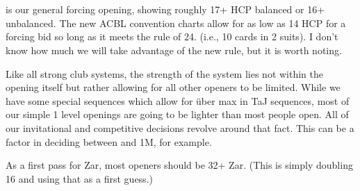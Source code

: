 \documentclass[tom-ari]{subfile}
\begin{document}
	
	\chapter[1C]{}
	
	 is our general forcing opening, showing roughly 17+ HCP balanced or 16+ unbalanced.  The new ACBL convention charts allow for as low as 14 HCP for a forcing bid so long as it meets the rule of 24.  (i.e., 10 cards in 2 suits).  I don't know how much we will take advantage of the new rule, but it is worth noting.
	
	Like all strong club systems, the strength of the system lies not within the  opening itself but rather allowing for all other openers to be limited.  While we have some special sequences which allow for \"{u}ber max in TaJ sequences, most of our simple 1 level openings are going to be lighter than most people open.  All of our invitational and competitive decisions revolve around that fact.  This can be a factor in deciding between  and 1M, for example.
	
	As a first pass for Zar, most  openers should be 32+ Zar.  (This is simply doubling 16 and using that as a first guess.)
	
	
\end{document}
